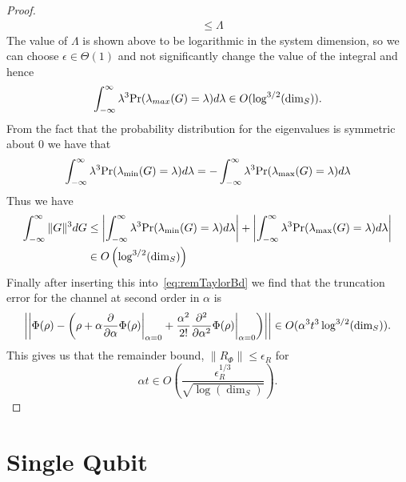 \documentclass{article}
\newcommand{\norm}[1]{\left| \left| #1 \right| \right|}
\DeclareMathOperator{\diag}{diag}
\begin{document}
\begin{proof}
\begin{align}
    &\le \Lambda
\end{align}
The value of $\Lambda$ is shown above to be logarithmic in the system dimension, so we can choose $\epsilon \in \Theta(1)$ and not significantly change the value of the integral and hence
\begin{equation}
    \int_{-\infty}^\infty \lambda^3 {\rm Pr}(\lambda_{max}(G) = \lambda) d\lambda \in O(\log^{3/2}(\dim_S)).
\end{equation}
From the fact that the probability distribution for the eigenvalues is symmetric about $0$ we have that
\begin{equation}
    \int_{-\infty}^\infty \lambda^3 {\rm Pr}(\lambda_{\min}(G) = \lambda) d\lambda = - \int_{-\infty}^\infty \lambda^3 {\rm Pr}(\lambda_{\max}(G) = \lambda) d\lambda
\end{equation}
Thus we have 
\begin{align}
    \int_{-\infty}^\infty \|G\|^3 dG &\le \left|\int_{-\infty}^\infty \lambda^3 {\rm Pr}(\lambda_{\min}(G) = \lambda) d\lambda \right| + \left|\int_{-\infty}^\infty \lambda^3 {\rm Pr}(\lambda_{\max}(G) = \lambda) d\lambda \right|\nonumber\\
    &\in O\left(\log^{3/2}(\dim_S) \right)
\end{align}
Finally after inserting this into~\eqref{eq:remTaylorBd} we find that the truncation error for the channel at second order in $\alpha$ is
\begin{equation}
    \norm{\Phi(\rho) - \left(\rho + {\alpha} \frac{\partial}{\partial \alpha} \Phi(\rho) \bigg|_{\alpha = 0} + \frac{\alpha^2}{2!} \frac{\partial^2}{\partial \alpha^2} \Phi(\rho) \bigg|_{\alpha = 0} \right)} \in O(\alpha^3 t^3 \log^{3/2}({\rm dim}_S)).
\end{equation}
This gives us that the remainder bound, $\|R_\Phi\|\le \epsilon_R$ for 
\begin{equation}
    \alpha t \in O\left(\frac{\epsilon_R^{1/3}}{\sqrt{\log(\dim_S)}} \right).
\end{equation}
\end{proof}

\section{Single Qubit}
\end{document}

